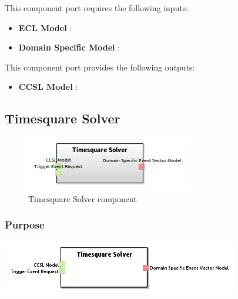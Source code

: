 \documentclass{gemoc} %
\begin{document}
This component port requires the following inputs:
\begin{itemize}
  \item \textbf{ECL Model} :
  \item \textbf{Domain Specific Model} :
\end{itemize}

This component port provides the following outputs:
\begin{itemize}
  \item \textbf{CCSL Model} :
\end{itemize}

\subsection{Timesquare Solver}

\begin{figure}[htp]
	\begin{center}
	\includegraphics*[trim=0.0cm 0.0cm 0cm 0.0cm, clip=true, scale=1.0]{../images/generated/Generated_Timesquare Solver.jpg}
	\caption{Timesquare Solver component}
	\end{center}
\end{figure}

\subsubsection{Purpose}

\begin{center}
\includegraphics*[trim=0.0cm 0.0cm 0cm 0.0cm, clip=true]{../images/generated/Generated_Timesquare_Solver.png}
\end{center}
\end{document}
